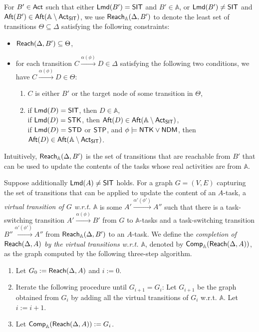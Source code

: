 For $B' \in {\sf Act}$ such that either ${\sf Lmd}(B') = {\sf SIT}$ and $B' \in \mathbb{A}$, or ${\sf Lmd}(B') \neq {\sf SIT}$ and ${\sf Aft}(B') \in {\sf Aft}(\mathbb{A} \setminus {\sf Act}_{\sf SIT})$,  we use ${\sf Reach}_\mathbb{A}(\Delta, B')$ to denote the least set of transitions $\Theta \subseteq \Delta$ satisfying the following constraints: 
\begin{itemize}
\item ${\sf Reach}(\Delta, B') \subseteq \Theta$, 
%
\item for each transition $C \xrightarrow{\alpha(\phi)} D \in \Delta$ satisfying the following two conditions, we have $C \xrightarrow{\alpha(\phi)} D \in \Theta$: 
\begin{enumerate}
\item $C$ is either $B'$ or the target node of some transition in $\Theta$, 
%
\item if ${\sf Lmd}(D) = {\sf SIT}$, then $D \in \mathbb{A}$,  \\
if ${\sf Lmd}(D) = {\sf STK}$, then ${\sf Aft}(D) \in {\sf Aft}(\mathbb{A} \setminus {\sf Act}_{\sf SIT})$, \\
if ${\sf Lmd}(D) = {\sf STD}$ or ${\sf STP}$, and $\phi \models {\sf NTK}\vee{\sf NDM}$,  then ${\sf Aft}(D) \in {\sf Aft}(\mathbb{A} \setminus {\sf Act}_{\sf SIT})$.
\end{enumerate}
\end{itemize}
Intuitively, ${\sf Reach}_\mathbb{A}(\Delta, B')$ is the set of transitions that are reachable from $B'$ that can be used to update the contents of the tasks whose real activities are from $ \mathbb{A}$.

Suppose additionally ${\sf Lmd}(A) \neq {\sf SIT}$ holds. For a graph $G=(V, E)$ capturing the set of transitions that can be applied to update the content of an $A$-task,  a \emph{virtual transition of $G$ w.r.t. $\mathbb{A}$} is some $A' \xrightarrow{\alpha'(\phi')} A''$ such that there is a task-switching transition $A' \xrightarrow{\alpha(\phi)} B'$ from $G$ to $\mathbb{A}$-tasks and a task-switching transition $B'' \xrightarrow{\alpha'(\phi')} A''$ from ${\sf Reach}_\mathbb{A}(\Delta, B')$ to an $A$-task.
We define the \emph{completion of ${\sf Reach}(\Delta, A)$ by the virtual transitions w.r.t. $\mathbb{A}$},  denoted by ${\sf Comp}_\mathbb{A}({\sf Reach}(\Delta, A))$, as the graph computed by the following three-step algorithm.
\begin{enumerate}
\item Let $G_0 := {\sf Reach}(\Delta, A)$ and $i:=0$. 
%
\item Iterate the following procedure until $G_{i+1} = G_i$: Let $G_{i+1}$ be the graph obtained from $G_i$ by adding all the virtual transitions of $G_i$ w.r.t. $\mathbb{A}$. Let $i:=i+1$. 
%
\item Let ${\sf Comp}_\mathbb{A}({\sf Reach}(\Delta, A)):=G_i$.
\end{enumerate}

